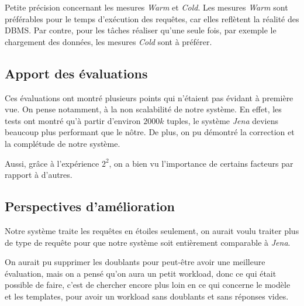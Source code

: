 \documentclass[12pt,titlepage]{article}
\begin{document}
Petite précision concernant les mesures \textit{Warm} et \textit{Cold}. Les mesures \textit{Warm} sont préférables pour le temps d'exécution des requêtes, car elles reflètent la réalité des DBMS. Par contre, pour les tâches réaliser qu'une seule fois, par exemple le chargement des données, les mesures \textit{Cold} sont à préférer.

\subsection{Apport des évaluations}

Ces évaluations ont montré plusieurs points qui n'étaient pas évidant à première vue. On pense notamment, à la non scalabilité de notre système. En effet, les tests ont montré qu'à partir d'environ $2000k$ tuples, le système \textit{Jena} deviens beaucoup plus performant que le nôtre. De plus, on pu démontré la correction et la complétude de notre système.

Aussi, grâce à l'expérience $2^2$, on a bien vu l'importance de certains facteurs par rapport à d'autres.

\subsection{Perspectives d'amélioration}

Notre système traite les requêtes en étoiles seulement, on aurait voulu traiter plus de type de requête pour que notre système soit entièrement comparable à \textit{Jena}.

On aurait pu supprimer les doublants pour peut-être avoir une meilleure évaluation, mais on a pensé qu'on aura un petit workload, donc ce qui était possible de faire, c'est de chercher encore plus loin en ce qui concerne le modèle et les templates, pour avoir un workload sans doublants et sans réponses vides. 
\end{document}
